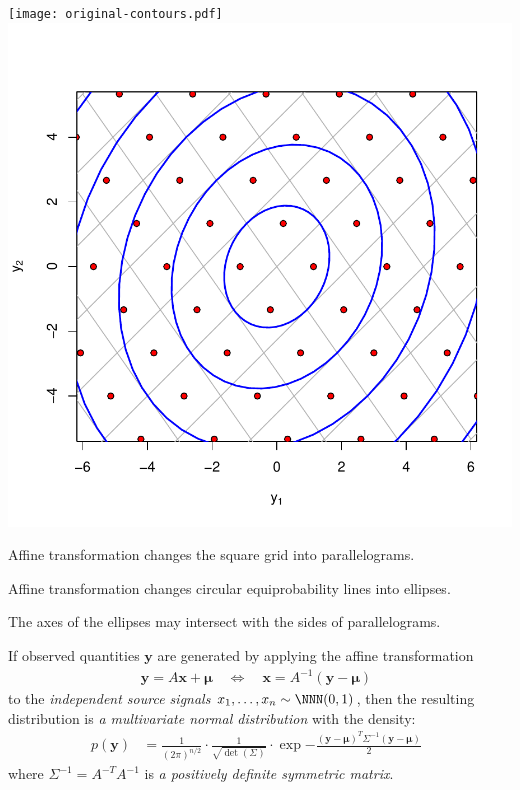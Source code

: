 \documentclass[landscape,footrule]{foils}
\renewcommand{\vec}[1]{\boldsymbol{#1}}
\begin{document}
\begin{center}
\texttt{[image: original-contours.pdf]}
\raisebox{4.0cm}{$\quad\xrightarrow{\vec{y}=A\vec{x}+\vec{\mu}}\quad$}
\includegraphics[scale=0.55]{transformed-contours.pdf}
\end{center}\vspace*{-0cm}

\begin{triangles}
\item Affine transformation changes the square grid into parallelograms. 
\item Affine transformation changes circular equiprobability lines into ellipses. 
\item The axes of the ellipses may intersect with the sides of parallelograms.
\end{triangles}




If observed quantities $\vec{y}$ are generated by applying the affine transformation 
\begin{align*}
 \vec{y}=A\vec{x}+\vec{\mu}\quad\Leftrightarrow\quad \vec{x}=A^{-1}(\vec{y}-\vec{\mu})\enspace
\end{align*}
to the \emph{independent source signals} $x_1,\ldots, x_n\sim\NNN(0,1)$, then the resulting distribution is \emph{a multivariate normal distribution} with the density:
\begin{align*}
p(\vec{y})&=\frac{1}{(2\pi)^{n/2}}\cdot\frac{1}{\sqrt{\det(\Sigma)}}\cdot
\exp{-\frac{(\vec{y}-\vec{\mu})^T \Sigma^{-1}(\vec{y}-\vec{\mu})}{2}}\enspace
\end{align*} 
where $\Sigma^{-1}=A^{-T}A^{-1}$ is \emph{a positively definite symmetric matrix}.
\end{document}
